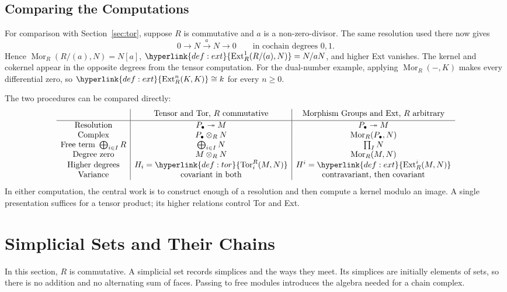\documentclass[11pt]{article}
\newcommand{\Mor}{\operatorname{Mor}}
\newcommand{\Tor}[3]{\hyperlink{def:tor}{\operatorname{Tor}^{R}_{#1}(#2,#3)}}
\newcommand{\Extn}[3]{\hyperlink{def:ext}{\operatorname{Ext}^{#1}_{R}(#2,#3)}}
\begin{document}
\subsection{Comparing the Computations}
For comparison with Section~\ref{sec:tor}, suppose $R$ is commutative and $a$ is a non-zero-divisor. The same resolution used there now gives
\[
0\longrightarrow N\xrightarrow{a}N\longrightarrow0
\qquad\text{in cochain degrees }0,1.
\]
Hence $\Mor_R(R/(a),N)=N[a]$, $\Extn{1}{R/(a)}{N}=N/aN$, and higher Ext vanishes. The kernel and cokernel appear in the opposite degrees from the tensor computation. For the dual-number example, applying $\Mor_R(-,K)$ makes every differential zero, so $\Extn{n}{K}{K}\cong k$ for every $n\geq0$.

The two procedures can be compared directly:
\[
\begin{array}{c|c|c}
&\text{Tensor and Tor, }R\text{ commutative}&\text{Morphism Groups and Ext, }R\text{ arbitrary}\\[2pt]\hline
\text{Resolution}&P_\bullet\twoheadrightarrow M&P_\bullet\twoheadrightarrow M\\
\text{Complex}&P_\bullet\otimes_R N&\Mor_R(P_\bullet,N)\\
\text{Free term }\bigoplus_{i\in I}R&\bigoplus_{i\in I}N&\prod_I N\\
\text{Degree zero}&M\otimes_R N&\Mor_R(M,N)\\
\text{Higher degrees}&H_i=\Tor{i}{M}{N}&H^i=\Extn{i}{M}{N}\\
\text{Variance}&\text{covariant in both}&\text{contravariant, then covariant}
\end{array}
\]
In either computation, the central work is to construct enough of a resolution and then compute a kernel modulo an image. A single presentation suffices for a tensor product; its higher relations control Tor and Ext.

\section{Simplicial Sets and Their Chains}\label{sec:simplicial}
In this section, $R$ is commutative. A simplicial set records simplices and the ways they meet. Its simplices are initially elements of sets, so there is no addition and no alternating sum of faces. Passing to free modules introduces the algebra needed for a chain complex.
\end{document}
